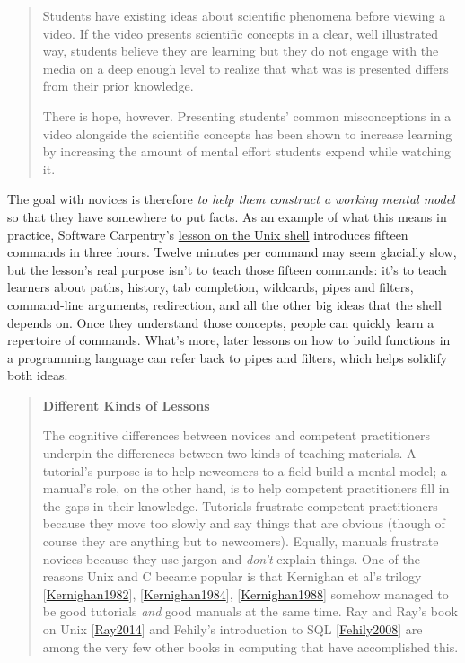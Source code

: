 \documentclass[10pt,statementpaper]{memoir}
\begin{document}
\begin{quote}
Students have existing ideas about scientific phenomena before viewing a
video. If the video presents scientific concepts in a clear, well
illustrated way, students believe they are learning but they do not
engage with the media on a deep enough level to realize that what was is
presented differs from their prior knowledge.

There is hope, however. Presenting students' common misconceptions in a
video alongside the scientific concepts has been shown to increase
learning by increasing the amount of mental effort students expend while
watching it.
\end{quote}

The goal with novices is therefore \emph{to help them construct a
working mental model} so that they have somewhere to put facts. As an
example of what this means in practice, Software Carpentry's
\href{http://swcarpentry.github.io/shell-novice/}{lesson on the Unix
shell} introduces fifteen commands in three hours. Twelve minutes per
command may seem glacially slow, but the lesson's real purpose isn't to
teach those fifteen commands: it's to teach learners about paths,
history, tab completion, wildcards, pipes and filters, command-line
arguments, redirection, and all the other big ideas that the shell
depends on. Once they understand those concepts, people can quickly
learn a repertoire of commands. What's more, later lessons on how to
build functions in a programming language can refer back to pipes and
filters, which helps solidify both ideas.

\begin{quote}
\textbf{Different Kinds of Lessons}

The cognitive differences between novices and competent practitioners
underpin the differences between two kinds of teaching materials. A
tutorial's purpose is to help newcomers to a field build a mental model;
a manual's role, on the other hand, is to help competent practitioners
fill in the gaps in their knowledge. Tutorials frustrate competent
practitioners because they move too slowly and say things that are
obvious (though of course they are anything but to newcomers). Equally,
manuals frustrate novices because they use jargon and \emph{don't}
explain things. One of the reasons Unix and C became popular is that
Kernighan et al's trilogy
{[}\href{biblio.html\#kernighan-plauger-elements}{Kernighan1982}{]},
{[}\href{biblio.html\#kernighan-pike-upe}{Kernighan1984}{]},
{[}\href{biblio.html\#kernighan-ritchie-c}{Kernighan1988}{]} somehow
managed to be good tutorials \emph{and} good manuals at the same time.
Ray and Ray's book on Unix
{[}\href{biblio.html\#ray-ray-unix}{Ray2014}{]} and Fehily's
introduction to SQL {[}\href{biblio.html\#fehily-sql}{Fehily2008}{]} are
among the very few other books in computing that have accomplished this.
\end{quote}
\end{document}
